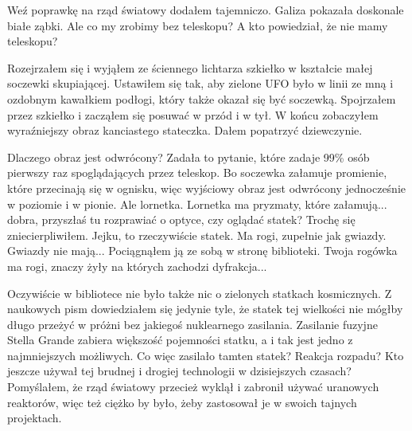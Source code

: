 \begin{dialogue}
	\ds{} Weź poprawkę na rząd światowy \dm{} dodałem tajemniczo. Galiza pokazała doskonale białe ząbki.
	\ds{} Ale co my zrobimy bez teleskopu?
	\ds{} A kto powiedział, że nie mamy teleskopu?
\end{dialogue}

Rozejrzałem się i wyjąłem ze ściennego lichtarza szkiełko w kształcie małej soczewki skupiającej.
Ustawiłem się tak, aby zielone UFO było w linii ze mną i ozdobnym kawałkiem podłogi, który także okazał się być soczewką.
Spojrzałem przez szkiełko i zacząłem się posuwać w przód i w tył. W końcu zobaczyłem wyraźniejszy obraz kanciastego stateczka.
Dałem popatrzyć dziewczynie.

\begin{dialogue}
	\ds{} Dlaczego obraz jest odwrócony? \dm{} Zadała to pytanie, które zadaje 99\% osób pierwszy raz spoglądających przez teleskop.
	\ds{} Bo soczewka załamuje promienie, które przecinają się w ognisku, więc wyjściowy obraz jest odwrócony jednocześnie w poziomie i w pionie.
	\ds{} Ale lornetka.
	\ds{} Lornetka ma pryzmaty, które załamują... dobra, przyszłaś tu rozprawiać o optyce, czy oglądać statek? \dm{} Trochę się zniecierpliwiłem.
	\ds{} Jejku, to rzeczywiście statek. Ma rogi, zupełnie jak gwiazdy.
	\ds{} Gwiazdy nie mają... \dm{} Pociągnąłem ją ze sobą w stronę biblioteki. \dm{} Twoja rogówka ma rogi, znaczy żyły na których zachodzi dyfrakcja...
\end{dialogue}

Oczywiście w bibliotece nie było także nic o zielonych statkach kosmicznych.
Z naukowych pism dowiedziałem się jedynie tyle, że statek tej wielkości nie mógłby długo przeżyć w próżni bez jakiegoś nuklearnego zasilania.
Zasilanie fuzyjne Stella Grande zabiera większość pojemności statku, a i tak jest jedno z najmniejszych możliwych. Co więc zasilało tamten statek?
Reakcja rozpadu? Kto jeszcze używał tej brudnej i drogiej technologii w dzisiejszych czasach?
Pomyślałem, że rząd światowy przecież wyklął i zabronił używać uranowych reaktorów, więc też ciężko by było, żeby zastosował je w swoich tajnych projektach.

